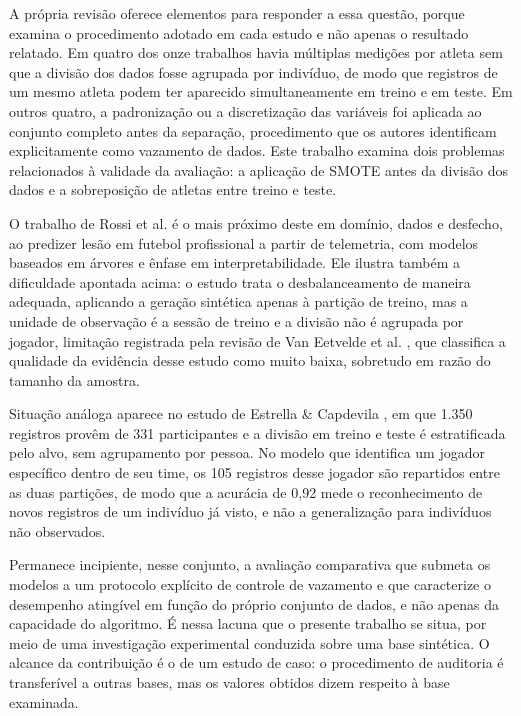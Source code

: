 A própria revisão oferece elementos para responder a essa questão, porque examina o procedimento adotado em cada estudo e não apenas o resultado relatado. Em quatro dos onze trabalhos havia múltiplas medições por atleta sem que a divisão dos dados fosse agrupada por indivíduo, de modo que registros de um mesmo atleta podem ter aparecido simultaneamente em treino e em teste. Em outros quatro, a padronização ou a discretização das variáveis foi aplicada ao conjunto completo antes da separação, procedimento que os autores identificam explicitamente como vazamento de dados. Este trabalho examina dois problemas relacionados à validade da avaliação: a aplicação de SMOTE antes da divisão dos dados e a sobreposição de atletas entre treino e teste.

O trabalho de Rossi et al. \cite{rossi2018} é o mais próximo deste em domínio, dados e desfecho, ao predizer lesão em futebol profissional a partir de telemetria, com modelos baseados em árvores e ênfase em interpretabilidade. Ele ilustra também a dificuldade apontada acima: o estudo trata o desbalanceamento de maneira adequada, aplicando a geração sintética apenas à partição de treino, mas a unidade de observação é a sessão de treino e a divisão não é agrupada por jogador, limitação registrada pela revisão de Van Eetvelde et al. \cite{vaneetvelde2021}, que classifica a qualidade da evidência desse estudo como muito baixa, sobretudo em razão do tamanho da amostra.

Situação análoga aparece no estudo de Estrella \& Capdevila \cite{estrella2025}, em que 1.350 registros provêm de 331 participantes e a divisão em treino e teste é estratificada pelo alvo, sem agrupamento por pessoa. No modelo que identifica um jogador específico dentro de seu time, os 105 registros desse jogador são repartidos entre as duas partições, de modo que a acurácia de 0{,}92 mede o reconhecimento de novos registros de um indivíduo já visto, e não a generalização para indivíduos não observados.

Permanece incipiente, nesse conjunto, a avaliação comparativa que submeta os modelos a um protocolo explícito de controle de vazamento e que caracterize o desempenho atingível em função do próprio conjunto de dados, e não apenas da capacidade do algoritmo. É nessa lacuna que o presente trabalho se situa, por meio de uma investigação experimental conduzida sobre uma base sintética. O alcance da contribuição é o de um estudo de caso: o procedimento de auditoria é transferível a outras bases, mas os valores obtidos dizem respeito à base examinada.

